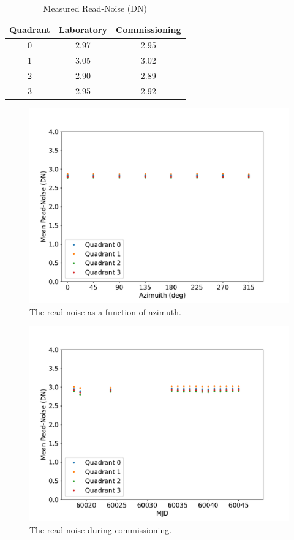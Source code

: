 \documentclass{article}
\begin{document}
\begin{table}[pb]
\begin{center}
\caption{Measured Read-Noise (DN)}
\label{table:read-noise}
\begin{tabular}{ccc}
\hline
Quadrant&Laboratory&Commissioning\\
\hline
0&2.97&2.95\\
1&3.05&3.02\\
2&2.90&2.89\\
3&2.95&2.92\\
\hline
\end{tabular}
\end{center}
\end{table}

\begin{figure}[pb]
\begin{center}
\includegraphics[width=0.7\columnwidth]{figures/read-noise-azimuth.pdf}
\medskip
\caption{The read-noise as a function of azimuth.}
\label{figure:read-noise-azimuth}
\end{center}
\end{figure}

\begin{figure}[pb]
\begin{center}
\includegraphics[width=0.7\columnwidth]{figures/read-noise-time.pdf}
\medskip
\caption{The read-noise during commissioning.}
\label{figure:read-noise-time}
\end{center}
\end{figure}
\end{document}
